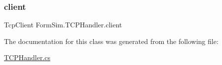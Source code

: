 \subsubsection{\texorpdfstring{client}{client}}
{\footnotesize\ttfamily Tcp\+Client Form\+Sim.\+T\+C\+P\+Handler.\+client\hspace{0.3cm}{\ttfamily [private]}}



The documentation for this class was generated from the following file\+:\begin{DoxyCompactItemize}
\item 
\mbox{\hyperlink{_t_c_p_handler_8cs}{T\+C\+P\+Handler.\+cs}}\end{DoxyCompactItemize}
